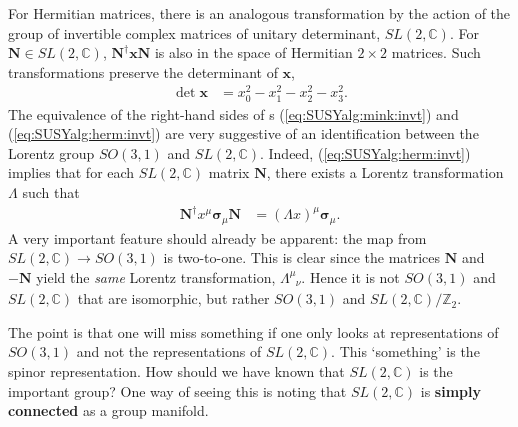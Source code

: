 \documentclass[12pt, oneside]{report}    %
\begin{document}
For Hermitian matrices, there is an analogous transformation by the action of the group of invertible complex matrices of unitary determinant, $SL(2,\mathbb C)$. For $\mathbf N \in SL(2,\mathbb C)$, $\mathbf N^\dag \mathbf{x} \mathbf N$
is also in the space of Hermitian $2\times 2$ matrices. Such transformations preserve the determinant of $\mathbf x$,
\begin{align}
    \det \mathbf{x} &= x_0^2 - x_1^2 - x_2^2 - x_3^2.\label{eq:SUSYalg:herm:invt}
\end{align}
The equivalence of the right-hand sides of s (\ref{eq:SUSYalg:mink:invt}) and (\ref{eq:SUSYalg:herm:invt}) are very suggestive of an identification between the Lorentz group $SO(3,1)$ and $SL(2,\mathbb C)$. Indeed,  (\ref{eq:SUSYalg:herm:invt}) implies that for each $SL(2,\mathbb C)$ matrix $\mathbf N$, there exists a Lorentz transformation $\Lambda$ such that 
\begin{align}
    \mathbf{N^\dag} x^\mu \mathbf{\sigma}_\mu \mathbf{N} &= (\Lambda x)^\mu \mathbf{\sigma}_\mu.\label{eq:SUSYalg:SL2C:Lorentz}
\end{align}
A very 
important feature should already be apparent: the map from $SL(2,\mathbb C)\rightarrow SO(3,1)$ is two-to-one. This is clear since the matrices $\mathbf N$ and $-\mathbf N$ yield the \textit{same} Lorentz transformation, $\Lambda^\mu_{\phantom\mu\nu}$. Hence it is not $SO(3,1)$ and $SL(2,\mathbb C)$ that are isomorphic, but rather $SO(3,1)$ and $SL(2,\mathbb C)/\mathbb Z_2$.

The point is that one will miss something if one only looks at representations of $SO(3,1)$ and not the representations of $SL(2,\mathbb C)$. This `something' is the spinor representation. How should we have known that $SL(2,\mathbb C)$ is the important group? One way of seeing this is noting that $SL(2,\mathbb C)$ is \textbf{simply connected} as a group manifold.
\end{document}
